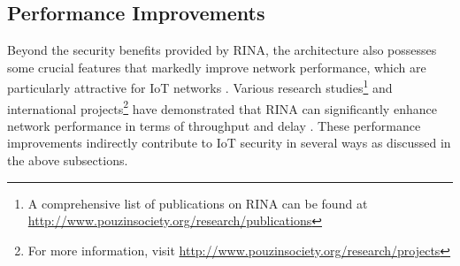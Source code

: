 \documentclass{ieeeaccess}
\begin{document}
\subsection{Performance Improvements}
Beyond the security benefits provided by RINA, the architecture also possesses some crucial features that markedly improve network performance, which are particularly attractive for IoT networks \cite{trouva2010internet}. Various research studies\footnote{A comprehensive list of publications on RINA can be found at \underline{http://www.pouzinsociety.org/research/publications}} and international projects\footnote{For more information, visit \underline{http://www.pouzinsociety.org/research/projects}} have demonstrated that RINA can significantly enhance network performance in terms of throughput and delay \cite{peymanICC16}. These performance improvements indirectly contribute to IoT security in several ways as discussed in the above subsections.

\end{document}
